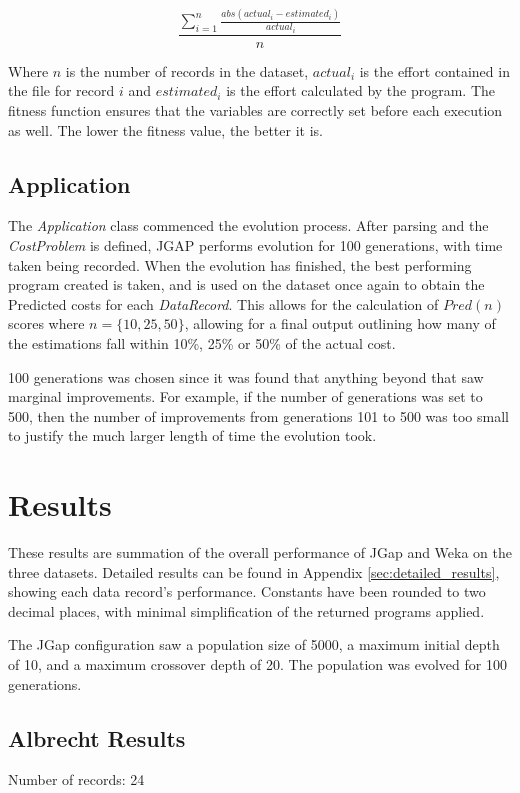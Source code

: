 \documentclass[11pt, a4paper]{article}
\begin{document}
\[\frac{\sum_{i = 1}^{n} \frac{abs(actual_i - estimated_i)}{actual_i}}{n}\]

Where \(n\) is the number of records in the dataset, \(actual_i\) is the effort
contained in the file for record \(i\) and \(estimated_i\) is the effort
calculated by the program. The fitness function ensures that the variables
are correctly set before each execution as well. The lower the fitness value,
the better it is.

\subsection{Application} %
\label{sub:application}
The \emph{Application} class commenced the evolution process. After parsing and
the \emph{CostProblem} is defined, JGAP performs evolution for 100 generations,
with time taken being recorded. When the evolution has finished, the best
performing program created is taken, and is used on the dataset once again to
obtain the Predicted costs for each \emph{DataRecord}. This allows for the
calculation of \(Pred(n)\) scores where \(n = \{10, 25, 50\}\), allowing for a
final output outlining how many of the estimations fall within 10\%, 25\% or
50\% of the actual cost.

100 generations was chosen since it was found that anything beyond that saw
marginal improvements. For example, if the number of generations was set to 500,
then the number of improvements from generations 101 to 500 was too small to
justify the much larger length of time the evolution took.

\section{Results} %
\label{sec:results}
These results are summation of the overall performance of JGap and Weka on the
three datasets. Detailed results can be found in Appendix
\ref{sec:detailed_results}, showing each data record's performance.
Constants have been rounded to two decimal places, with minimal simplification
of the returned programs applied.

The JGap configuration saw a population size of 5000, a maximum initial depth of
10, and a maximum crossover depth of 20. The population was evolved for 100
generations.

\subsection{Albrecht Results} %
\label{sub:albrecht_results}
Number of records: 24
\end{document}
